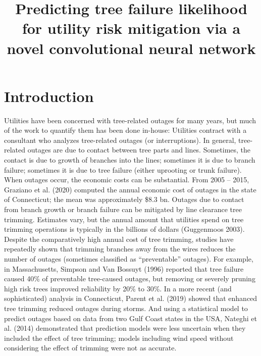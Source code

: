 \documentclass[11pt,twoside]{article}
\numberwithin{equation}{section}
\newcommand{\?}{\stackrel{?}{=}}
\begin{document}
\title{Predicting tree failure likelihood for utility risk mitigation via a novel convolutional neural network}
\date{}
\maketitle


\section{Introduction}
Utilities have been concerned with tree-related outages for many years, but much of the work to quantify them has been done in-house: Utilities contract with a consultant who analyzes tree-related outages (or interruptions). In general, tree-related outages are due to contact between tree parts and lines. Sometimes, the contact is due to growth of branches into the lines; sometimes it is due to branch failure; sometimes it is due to tree failure (either uprooting or trunk failure). When outages occur, the economic costs can be substantial. From 2005 – 2015, Graziano et al. (2020) computed the annual economic cost of outages in the state of Connecticut; the mean was approximately \$8.3 bn.
Outages due to contact from branch growth or branch failure can be mitigated by line clearance tree trimming. Estimates vary, but the annual amount that utilities spend on tree trimming operations is typically in the billions of dollars (Guggenmoos 2003). Despite the comparatively high annual cost of tree trimming, studies have repeatedly shown that trimming branches away from the wires reduces the number of outages (sometimes classified as “preventable” outages). For example, in Massachusetts, Simpson and Van Bossuyt (1996) reported that tree failure caused 40\% of preventable tree-caused outages, but removing or severely pruning high risk trees improved reliability by 20\% to 30\%. In a more recent (and sophisticated) analysis in Connecticut, Parent et al. (2019) showed that enhanced tree trimming reduced outages during storms. And using a statistical model to predict outages based on data from two Gulf Coast states in the USA, Nateghi et al. (2014) demonstrated that prediction models were less uncertain when they included the effect of tree trimming; models including wind speed without considering the effect of trimming were not as accurate.
\end{document}
